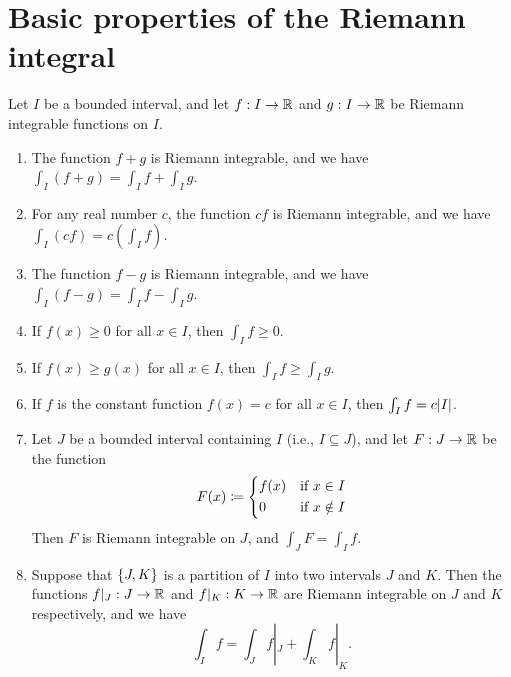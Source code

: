 \section{Basic properties of the Riemann integral}\label{i:sec:11.4}

\begin{thm}\label{i:11.4.1}
  Let \(I\) be a bounded interval, and let \(f : I \to \mathbb{R}\) and \(g : I \to \mathbb{R}\) be Riemann integrable functions on \(I\).
  \begin{enumerate}
    \item The function \(f + g\) is Riemann integrable, and we have \(\int_I (f + g) = \int_I f + \int_I g\).
    \item For any real number \(c\), the function \(cf\) is Riemann integrable, and we have \(\int_I (cf) = c(\int_I f)\).
    \item The function \(f - g\) is Riemann integrable, and we have \(\int_I (f - g) = \int_I f - \int_I g\).
    \item If \(f(x) \geq 0\) for all \(x \in I\), then \(\int_I f \geq 0\).
    \item If \(f(x) \geq g(x)\) for all \(x \in I\), then \(\int_I f \geq \int_I g\).
    \item If \(f\) is the constant function \(f(x) = c\) for all \(x \in I\), then \(\int_I f = c \abs{I}\).
    \item Let \(J\) be a bounded interval containing \(I\) (i.e., \(I \subseteq J\)), and let \(F : J \to \mathbb{R}\) be the function
          \[
            F(x) \coloneqq \begin{dcases}
              f(x) & \text{if } x \in I    \\
              0    & \text{if } x \notin I \\
            \end{dcases}
          \]
          Then \(F\) is Riemann integrable on \(J\), and \(\int_J F = \int_I f\).
    \item Suppose that \(\left\lbrace J, K\right\rbrace\) is a partition of \(I\) into two intervals \(J\) and \(K\).
          Then the functions \(f|_J : J \to \mathbb{R}\) and \(f|_K : K \to \mathbb{R}\) are Riemann integrable on \(J\) and \(K\) respectively, and we have
          \[
            \int_I f = \int_J f|_J + \int_K f|_K.
          \]
  \end{enumerate}
\end{thm}

